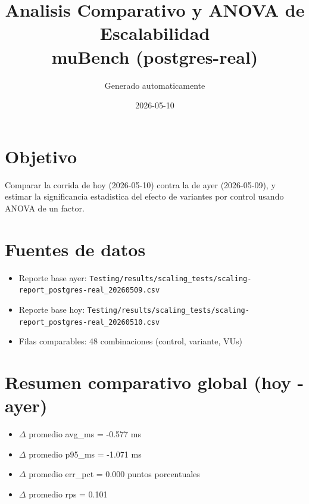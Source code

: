 \documentclass[11pt]{article}
\title{Analisis Comparativo y ANOVA de Escalabilidad\\muBench (postgres-real)}
\author{Generado automaticamente}
\date{2026-05-10}
\begin{document}
\maketitle

\section*{Objetivo}
Comparar la corrida de hoy (2026-05-10) contra la de ayer (2026-05-09), y estimar la significancia estadistica del efecto de variantes por control usando ANOVA de un factor.

\section*{Fuentes de datos}
\begin{itemize}
  \item Reporte base ayer: \texttt{Testing/results/scaling_tests/scaling-report_postgres-real_20260509.csv}
  \item Reporte base hoy: \texttt{Testing/results/scaling_tests/scaling-report_postgres-real_20260510.csv}
  \item Filas comparables: 48 combinaciones (control, variante, VUs)
\end{itemize}

\section*{Resumen comparativo global (hoy - ayer)}
\begin{itemize}
  \item $\Delta$ promedio avg\_ms = -0.577 ms
  \item $\Delta$ promedio p95\_ms = -1.071 ms
  \item $\Delta$ promedio err\_pct = 0.000 puntos porcentuales
  \item $\Delta$ promedio rps = 0.101
\end{itemize}
\end{document}
